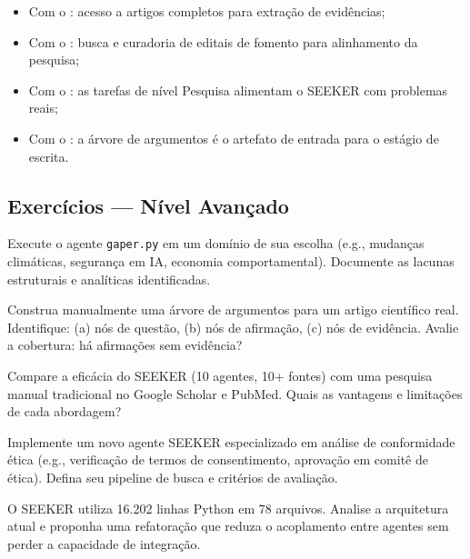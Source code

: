 \begin{itemize}
\item Com o : acesso a artigos completos para
extração de evidências;
\item Com o : busca e curadoria de editais de
fomento para alinhamento da pesquisa;
\item Com o : as tarefas de nível Pesquisa
alimentam o SEEKER com problemas reais;
\item Com o : a árvore de argumentos é o artefato
de entrada para o estágio de escrita.
\end{itemize}

\subsection{Exercícios — Nível Avançado}

\begin{exercicio}
Execute o agente \texttt{gaper.py} em um domínio de sua escolha
(e.g., mudanças climáticas, segurança em IA, economia
comportamental). Documente as lacunas estruturais e analíticas
identificadas.
\end{exercicio}

\begin{exercicio}
Construa manualmente uma árvore de argumentos para um artigo
científico real. Identifique: (a) nós de questão, (b) nós de
afirmação, (c) nós de evidência. Avalie a cobertura: há afirmações
sem evidência?
\end{exercicio}

\begin{exercicio}
Compare a eficácia do SEEKER (10 agentes, 10+ fontes) com uma
pesquisa manual tradicional no Google Scholar e PubMed. Quais as
vantagens e limitações de cada abordagem?
\end{exercicio}

\begin{exercicio}
Implemente um novo agente SEEKER especializado em análise de
conformidade ética (e.g., verificação de termos de consentimento,
aprovação em comitê de ética). Defina seu pipeline de busca e
critérios de avaliação.
\end{exercicio}

\begin{exercicio}
O SEEKER utiliza 16.202 linhas Python em 78 arquivos. Analise a
arquitetura atual e proponha uma refatoração que reduza o acoplamento
entre agentes sem perder a capacidade de integração.
\end{exercicio}

